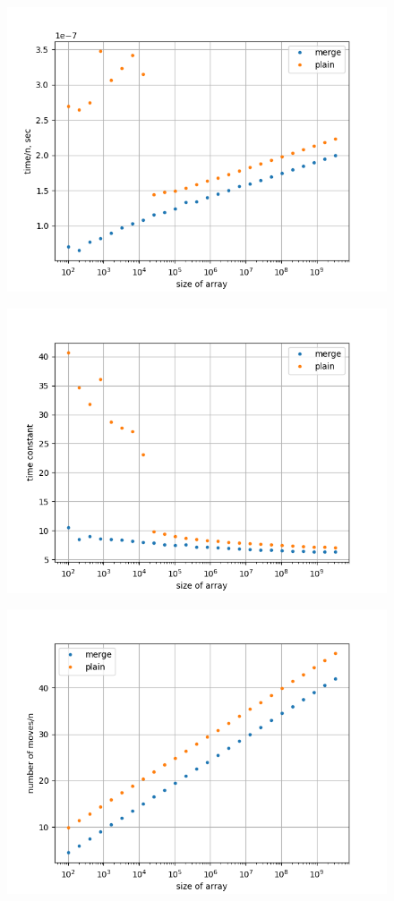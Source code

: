 \documentclass[14pt]{extarticle}
\begin{document}
\begin{figure}[H]
	\centering
	\includegraphics[scale=1]{Figure_3}
\end{figure}

\begin{figure}[H]
	\centering
	\includegraphics[scale=1]{Figure_4}
\end{figure}

\begin{figure}[H]
	\centering
	\includegraphics[scale=1]{Figure_1}
\end{figure}
\end{document}
